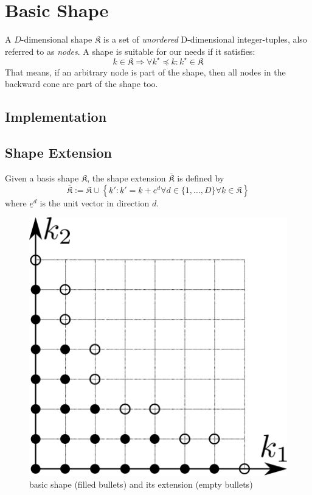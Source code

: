 \documentclass{article}
\begin{document}
\section{Basic Shape}

A \(D\)-dimensional
shape \(\mathfrak{K}\)
is a set of \emph{unordered} D-dimensional integer-tuples, also
referred to as \emph{nodes}.  A shape is suitable for our needs if it
satisfies:
\[k \in \mathfrak{K} \Rightarrow \forall k^\star \preceq k \colon
  k^\star \in \mathfrak{K}\]
That means, if an arbitrary node is part of the shape, then all nodes
in the backward cone are part of the shape too.

\subsection{Implementation}

\subsection{Shape Extension}

\begin{definition}
  Given a basis shape \( \mathfrak{K} \),
  the shape extension \( \overline{\mathfrak{K}} \) is defined by
  \begin{equation}
    \overline{\mathfrak{K}} := \mathfrak{K} \cup 
    \left\{\underline{k}' \colon \underline{k}' = \underline{k} + \underline{e}^d 
      \forall d \in \{1,\ldots,D\} \forall \underline{k} \in \mathfrak{K}\right\}
  \end{equation}
  where \( \underline{e}^d \) is the unit vector in direction \( d \).
\end{definition}

\begin{figure}[H]
  \begin{center}
    \includegraphics[width=0.5\linewidth]{shape_extension}
  \end{center}
  \caption{basic shape (filled bullets) and its extension (empty
    bullets)}
\end{figure}
\end{document}
